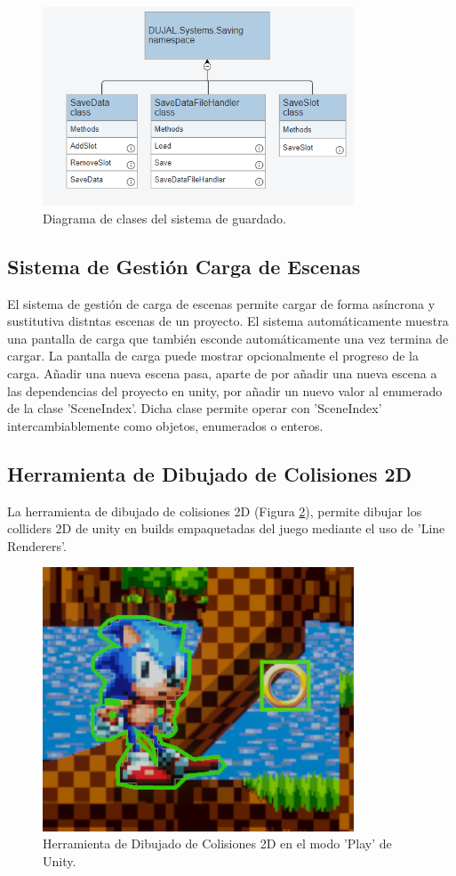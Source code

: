 \begin{figure}[H]
  \centering
    \includegraphics[width=350px,clip=true]{Saving.png}
  \caption{Diagrama de clases del sistema de guardado.}
  \label{fig:savinguml}
\end{figure}

\subsection{Sistema de Gestión Carga de Escenas}
El sistema de gestión de carga de escenas permite cargar de forma asíncrona y sustitutiva distntas escenas de un proyecto. El sistema automáticamente muestra una 
pantalla de carga que también esconde automáticamente una vez termina de cargar. La pantalla de carga puede mostrar opcionalmente el progreso de la carga. Añadir una nueva
 escena pasa, aparte de por añadir una nueva escena a las dependencias del proyecto en unity, por añadir un nuevo valor al enumerado de la clase 'SceneIndex'. Dicha clase 
 permite operar con 'SceneIndex' intercambiablemente como objetos, enumerados o enteros.

\subsection{Herramienta de Dibujado de Colisiones 2D}
La herramienta de dibujado de colisiones 2D (Figura \ref{fig:debug2d}), permite dibujar los colliders 2D de unity en builds empaquetadas del juego mediante el uso de
 'Line Renderers'. 

\begin{figure}[H]
  \centering
    \includegraphics[width=350px,clip=true]{debug2d.png}
  \caption{Herramienta de Dibujado de Colisiones 2D en el modo 'Play' de Unity.}
  \label{fig:debug2d}
\end{figure}

